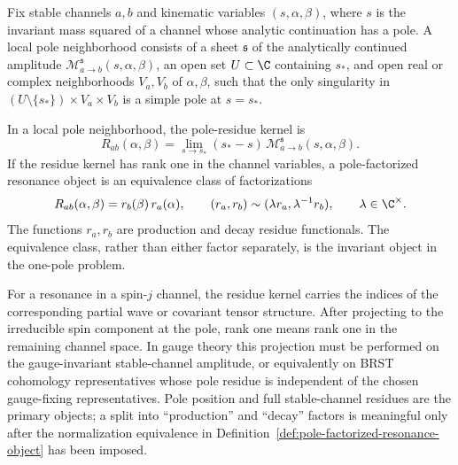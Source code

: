 \begin{definition}
Fix stable channels \(a,b\) and kinematic variables
\((s,\alpha,\beta)\), where \(s\) is the invariant mass squared of a channel
whose analytic continuation has a pole.  A local pole neighborhood consists
of a sheet \(\mathfrak s\) of the analytically continued amplitude
\(\mathcal M^{\mathfrak s}_{a\to b}(s,\alpha,\beta)\), an open set
\(U\subset\C\) containing \(s_\ast\), and open real or complex neighborhoods
\(V_a,V_b\) of \(\alpha,\beta\), such that the only singularity in
\((U\setminus\{s_\ast\})\times V_a\times V_b\) is a simple pole at
\(s=s_\ast\).
\end{definition}

\begin{definition}
\label{def:pole-factorized-resonance-object}
In a local pole neighborhood, the pole-residue kernel is
\begin{equation}
  R_{ab}(\alpha,\beta)
  =
  \lim_{s\to s_\ast}
  (s_\ast-s)\,
  \mathcal M^{\mathfrak s}_{a\to b}(s,\alpha,\beta).
  \label{eq:resonance-residue-kernel}
\end{equation}
If the residue kernel has rank one in the channel variables, a
pole-factorized resonance object is an equivalence class of factorizations
\[
  R_{ab}(\alpha,\beta)=r_{b}(\beta)\,r_{a}(\alpha),
  \qquad
  (r_a,r_b)\sim(\lambda r_a,\lambda^{-1}r_b),
  \qquad
  \lambda\in\C^\times .
\]
The functions \(r_a,r_b\) are production and decay residue functionals.  The
equivalence class, rather than either factor separately, is the invariant
object in the one-pole problem.
\end{definition}

For a resonance in a spin-\(j\) channel, the residue kernel carries the
indices of the corresponding partial wave or covariant tensor structure.
After projecting to the irreducible spin component at the pole, rank one means
rank one in the remaining channel space.  In gauge theory this projection must
be performed on the gauge-invariant stable-channel amplitude, or
equivalently on BRST cohomology representatives whose pole residue is
independent of the chosen gauge-fixing representatives.  Pole position and
full stable-channel residues are the primary objects; a split into
``production'' and ``decay'' factors is meaningful only after the
normalization equivalence in
Definition~\ref{def:pole-factorized-resonance-object} has been imposed.

